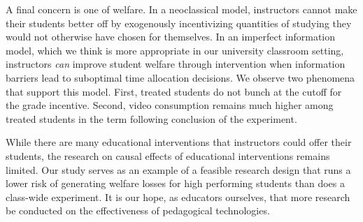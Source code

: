 \documentclass[12pt]{article}
\begin{document}
A final concern is one of welfare. In a neoclassical model, instructors cannot make their students better off by exogenously incentivizing quantities of studying they would not otherwise have chosen for themselves. In an imperfect information model, which we think is more appropriate in our university classroom setting, instructors \textit{can} improve student welfare through intervention when information barriers lead to suboptimal time allocation decisions. We observe two phenomena that support this model. First, treated students do not bunch at the cutoff for the grade incentive. Second, video consumption remains much higher among treated students in the term following conclusion of the experiment.

While there are many educational interventions that instructors could offer their students, the research on causal effects of educational interventions remains limited. Our study serves as an example of a feasible research design that runs a lower risk of generating welfare losses for high performing students than does a class-wide experiment. It is our hope, as educators ourselves, that more research be conducted on the effectiveness of pedagogical technologies.

\printbibliography


\clearpage


\clearpage


\clearpage


\clearpage


\clearpage


\end{document}
